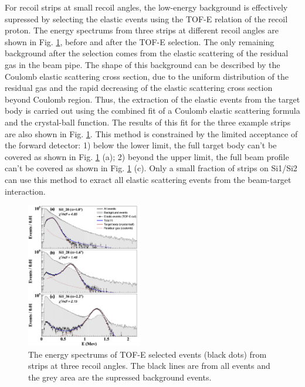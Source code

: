 \documentclass[fleqn,twocolumn,a4paper]{ikpar}
\begin{document}
For recoil strips at small recoil angles, the low-energy background is effectively supressed by selecting the elastic
events using the TOF-E relation of the recoil proton.
The energy spectrums from three strips at different recoil angles are shown in
Fig. \ref{fig:coulomb_cb2_fit},  before and after the TOF-E selection.
The only remaining background after the selection comes from the elastic scattering of the residual gas in the beam pipe.
The shape of this background can be described by the Coulomb elastic scattering cross
section, due to the uniform distribution of the residual gas and the rapid decreasing of
the elastic scattering cross section beyond Coulomb region.
Thus, the extraction of the elastic events from the target body is carried out
using the combined fit of a Coulomb elastic scattering formula and the crystal-ball
function.
The results of this fit for the three example strips are also shown in Fig. \ref{fig:coulomb_cb2_fit}.
This method is constrained by the limited acceptance of the forward detector:
1) below the lower limit, the full target body can't be covered as shown in Fig.
\ref{fig:coulomb_cb2_fit} (a);
2) beyond the upper limit, the full beam profile can't be covered as shown in
Fig. \ref{fig:coulomb_cb2_fit} (c).
Only a small fraction of strips on Si1/Si2 can use this method to exract all
elastic scattering events from the beam-target interaction.
\begin{figure}[!htb]
	\includegraphics[width=0.45\textwidth]{./coulomb_cb2_fit.png}
  \caption{The energy spectrums of TOF-E selected events (black dots) from strips at three
    recoil angles. The black lines are from all events and the grey area are the
  supressed background events. }
  \label{fig:coulomb_cb2_fit}
\end{figure}
\end{document}
